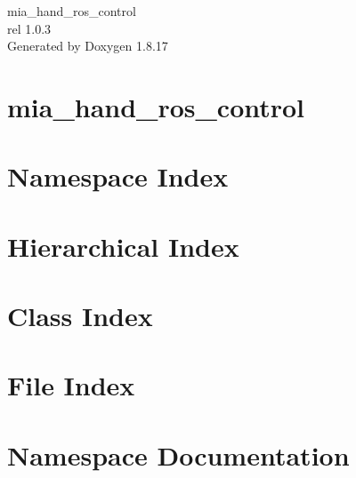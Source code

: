 \let\mypdfximage\pdfximage\def\pdfximage{\immediate\mypdfximage}\documentclass[twoside]{book}
\newcommand{\+}{\discretionary{\mbox{\scriptsize$\hookleftarrow$}}{}{}}
\newcommand{\clearemptydoublepage}{%
  \newpage{\pagestyle{empty}\cleardoublepage}%
}
\begin{document}
\hypersetup{pageanchor=false,
             bookmarksnumbered=true,
             pdfencoding=unicode
            }
\begin{titlepage}
\vspace*{7cm}
\begin{center}%
{\Large mia\+\_\+hand\+\_\+ros\+\_\+control \\[1ex]\large rel 1.\+0.\+3 }\\
\vspace*{1cm}
{\large Generated by Doxygen 1.8.17}\\
\end{center}
\end{titlepage}
\clearemptydoublepage
{}
\tableofcontents
\clearemptydoublepage
{}
\hypersetup{pageanchor=true}

\chapter{mia\+\_\+hand\+\_\+ros\+\_\+control}
\label{md_home_prensila_ros_ws_src_mia_hand_ros_pkgs_mia_hand_ros_control__r_e_a_d_m_e}

\chapter{Namespace Index}

\chapter{Hierarchical Index}

\chapter{Class Index}

\chapter{File Index}

\chapter{Namespace Documentation}


\end{document}
